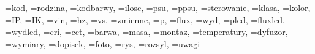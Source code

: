 \documentclass[12pt,twoside]{article}
\begin{document}
\DTLsetseparator{;} 
\DTLforeach* %
{myDB}%
{ \kod=kod, \rodzina=rodzina, \kodbarwy=kodbarwy, \ilosc=ilosc, \psu=psu, \ppsu=ppsu, \sterowanie=sterowanie, \klasa=klasa, \kolor=kolor, \IP=IP, \IK=IK, \vin=vin, \hz=hz, \vs=vs, \zmienne=zmienne, \p=p, \flux=flux, \wyd=wyd, \pled=pled, \fluxled=fluxled, \wydled=wydled, \cri=cri, \cct=cct, \barwa=barwa, \masa=masa, \montaz=montaz, \temperatury=temperatury, \dyfuzor=dyfuzor, \wymiary=wymiary, \dopisek=dopisek, \foto=foto, \rys=rys, \rozsyl=rozsyl, \uwagi=uwagi}
\end{document}
